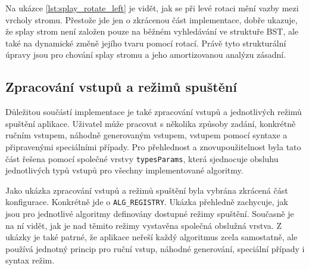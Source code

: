 Na ukázce \ref{lst:splay_rotate_left} je vidět, jak se při levé rotaci mění vazby mezi vrcholy stromu. Přestože jde jen o zkrácenou část implementace, dobře ukazuje, že splay strom není založen pouze na běžném vyhledávání ve struktuře BST, ale také na dynamické změně jejího tvaru pomocí rotací. Právě tyto strukturální úpravy jsou pro chování splay stromu a jeho amortizovanou analýzu zásadní.

\subsection{Zpracování vstupů a režimů spuštění}
Důležitou součástí implementace je také zpracování vstupů a jednotlivých režimů spuštění aplikace. Uživatel může pracovat s několika způsoby zadání, konkrétně ručním vstupem, náhodně generovaným vstupem, vstupem pomocí syntaxe a připravenými speciálními případy. Pro přehlednost a znovupoužitelnost byla tato část řešena pomocí společné vrstvy \texttt{typesParams}, která sjednocuje obsluhu jednotlivých typů vstupů pro všechny implementované algoritmy.

Jako ukázka zpracování vstupů a režimů spuštění byla vybrána zkrácená část konfigurace. Konkrétně jde o \texttt{ALG\_REGISTRY}. Ukázka přehledně zachycuje, jak jsou pro jednotlivé algoritmy definovány dostupné režimy spuštění. Současně je na ní vidět, jak je nad těmito režimy vystavěna společná obslužná vrstva. Z ukázky je také patrné, že aplikace neřeší každý algoritmus zcela samostatně, ale používá jednotný princip pro ruční vstup, náhodné generování, speciální případy i syntax režim.

